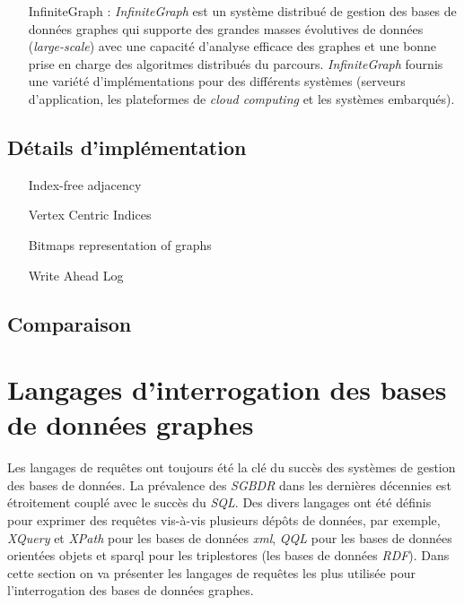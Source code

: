 \begin{itemize}
    \item [InfiniteGraph]: \emph{InfiniteGraph} \cite{infinitegraph}
      est un système distribué de gestion des bases de données graphes
      qui supporte des grandes masses évolutives de données
      (\emph{large-scale}) avec une capacité d'analyse efficace des
      graphes et une bonne prise en charge des algoritmes distribués
      du parcours. \emph{InfiniteGraph} fournis une variété
      d'implémentations pour des différents systèmes (serveurs
      d'application, les plateformes de \emph{cloud computing} et les
      systèmes embarqués).
    \end{itemize}

  \subsection{Détails d'implémentation}
  \label{graph-internals}
  \begin{itemize}
  \item [Index-free adjacency]
  \item [Vertex Centric Indices]
  \item [Bitmaps representation of graphs]
  \item [Write Ahead Log]
  \end{itemize}

  \subsection{Comparaison}
  \label{sec:graphdb-comp}

\newpage
\section{Langages d'interrogation des bases de données graphes}
\label{query-languages}

Les langages de requêtes ont toujours été la clé du succès des
systèmes de gestion des bases de données. La prévalence des
\emph{\acrshort{SGBDR}} dans les dernières décennies est étroitement
couplé avec le succès du \emph{SQL}. Des divers langages ont été
définis pour exprimer des requêtes vis-à-vis plusieurs dépôts de
données, par exemple, \emph{XQuery} \cite{boag2002xquery} et
\emph{XPath} \cite{clark1999xml} pour les bases de données
\emph{\acrshort{xml}}, \emph{QQL} \cite{alashqur1989oql} pour les
bases de données orientées objets et \acrshort{sparql}
\cite{prud2008sparql} pour les triplestores (les bases de données
\emph{RDF}). Dans cette section on va présenter les langages de
requêtes les plus utilisée pour l'interrogation des bases de données
graphes.

